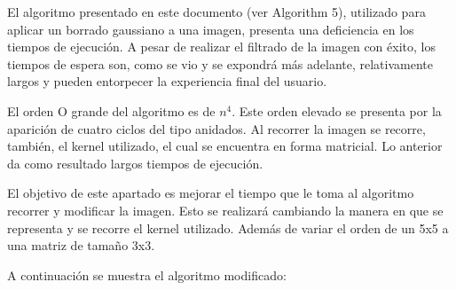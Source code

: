 \documentclass[conference]{IEEEtran}
\begin{document}
El algoritmo presentado en este documento (ver Algorithm 5), utilizado para aplicar un borrado gaussiano a una imagen, presenta una deficiencia en los tiempos de ejecución. A pesar de realizar el filtrado de la imagen con éxito, los tiempos de espera son, como se vio y se expondrá más adelante, relativamente largos y pueden entorpecer la experiencia final del usuario.\newline

El orden O grande del algoritmo es de $n^4$. Este orden elevado se presenta por la aparición de cuatro ciclos del tipo \for anidados. Al recorrer la imagen se recorre, también, el kernel utilizado, el cual se encuentra en forma matricial. Lo anterior da como resultado largos tiempos de ejecución.\newline

El objetivo de este apartado es mejorar el tiempo que le toma al algoritmo recorrer y modificar la imagen. Esto se realizará cambiando la manera en que se representa y se recorre el kernel utilizado. Además de variar el orden de un 5x5 a una matriz de tamaño 3x3.\newline

A continuación se muestra el algoritmo modificado:\newline
\end{document}
